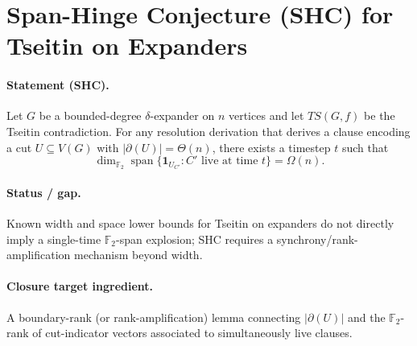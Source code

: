 \section{Span-Hinge Conjecture (SHC) for Tseitin on Expanders}

\paragraph{Statement (SHC).}
Let $G$ be a bounded-degree $\delta$-expander on $n$ vertices and let $TS(G,f)$ be the Tseitin contradiction.
For any resolution derivation that derives a clause encoding a cut $U\subseteq V(G)$ with
$|\partial(U)|=\Theta(n)$, there exists a timestep $t$ such that
\[
\dim_{\mathbb F_2}\operatorname{span}\{\mathbf 1_{U_{C'}}: C' \text{ live at time } t\}=\Omega(n).
\]

\paragraph{Status / gap.}
Known width and space lower bounds for Tseitin on expanders do not directly imply a single-time
$\mathbb F_2$-span explosion; SHC requires a synchrony/rank-amplification mechanism beyond width.

\paragraph{Closure target ingredient.}
A boundary-rank (or rank-amplification) lemma connecting $|\partial(U)|$ and the
$\mathbb F_2$-rank of cut-indicator vectors associated to simultaneously live clauses.
